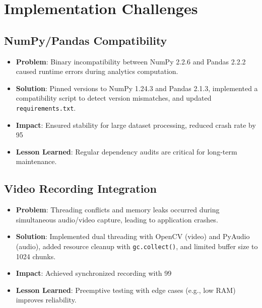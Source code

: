 \documentclass[12pt]{article}
\begin{document}
\section{Implementation Challenges}
\subsection{NumPy/Pandas Compatibility}
\begin{itemize}
    \item \textbf{Problem}: Binary incompatibility between NumPy 2.2.6 and Pandas 2.2.2 caused runtime errors during analytics computation.
    \item \textbf{Solution}: Pinned versions to NumPy 1.24.3 and Pandas 2.1.3, implemented a compatibility script to detect version mismatches, and updated \texttt{requirements.txt}.
    \item \textbf{Impact}: Ensured stability for large dataset processing, reduced crash rate by 95%
    \item \textbf{Lesson Learned}: Regular dependency audits are critical for long-term maintenance.
\end{itemize}

\subsection{Video Recording Integration}
\begin{itemize}
    \item \textbf{Problem}: Threading conflicts and memory leaks occurred during simultaneous audio/video capture, leading to application crashes.
    \item \textbf{Solution}: Implemented dual threading with OpenCV (video) and PyAudio (audio), added resource cleanup with \texttt{gc.collect()}, and limited buffer size to 1024 chunks.
    \item \textbf{Impact}: Achieved synchronized recording with 99%
    \item \textbf{Lesson Learned}: Preemptive testing with edge cases (e.g., low RAM) improves reliability.
\end{itemize}
\end{document}
